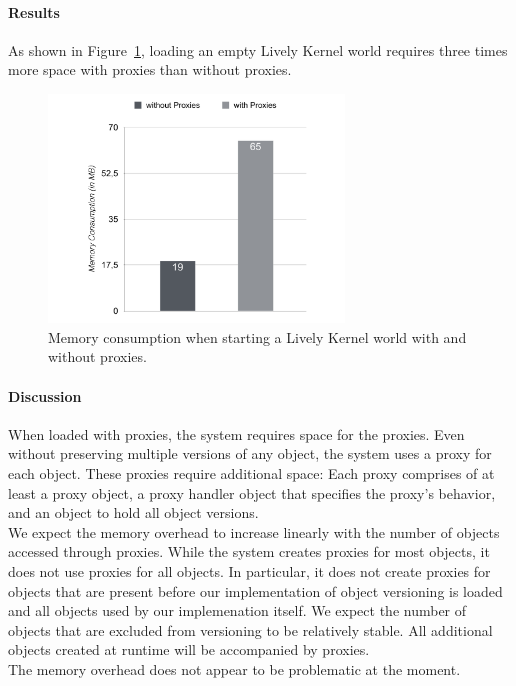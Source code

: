\paragraph{Results}
As shown in Figure~\ref{fig:MemoryOverheadForReferences}, loading an empty Lively Kernel world requires three times more space with proxies than without proxies.

\begin{figure}[h!]
    \centering
    \includegraphics[width=0.7\textwidth]{figures/6_evaluation/1_memoryOverhead.pdf}
    \caption{Memory consumption when starting a Lively Kernel world with and without proxies.}
    \label{fig:MemoryOverheadForReferences}
\end{figure}

\paragraph{Discussion}
When loaded with proxies, the system requires space for the proxies.
Even without preserving multiple versions of any object, the system uses a proxy for each object.
These proxies require additional space: Each proxy comprises of at least a proxy object, a proxy handler object that specifies the proxy's behavior, and an object to hold all object versions.\\
We expect the memory overhead to increase linearly with the number of objects accessed through proxies.
While the system creates proxies for most objects, it does not use proxies for all objects.
In particular, it does not create proxies for objects that are present before our implementation of object versioning is loaded and all objects used by our implemenation itself.
We expect the number of objects that are excluded from versioning to be relatively stable.
All additional objects created at runtime will be accompanied by proxies.\\
The memory overhead does not appear to be problematic at the moment.


